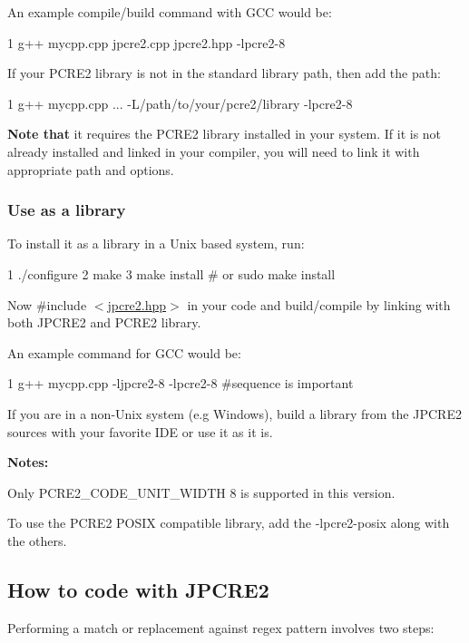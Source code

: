 An example compile/build command with G\+CC would be\+:


\begin{DoxyCode}
1 g++ mycpp.cpp jpcre2.cpp jpcre2.hpp -lpcre2-8
\end{DoxyCode}


If your P\+C\+R\+E2 library is not in the standard library path, then add the path\+:


\begin{DoxyCode}
1 g++ mycpp.cpp ... -L/path/to/your/pcre2/library -lpcre2-8
\end{DoxyCode}


{\bfseries Note that} it requires the P\+C\+R\+E2 library installed in your system. If it is not already installed and linked in your compiler, you will need to link it with appropriate path and options.\hypertarget{index_install-as-a-library}{}\subsubsection{Use as a library}\label{index_install-as-a-library}
To install it as a library in a Unix based system, run\+:


\begin{DoxyCode}
1 ./configure
2 make
3 make install # or sudo make install
\end{DoxyCode}
 Now {\ttfamily \#include $<$\hyperlink{jpcre2_8hpp}{jpcre2.\+hpp}$>$} in your code and build/compile by linking with both J\+P\+C\+R\+E2 and P\+C\+R\+E2 library.

An example command for G\+CC would be\+:


\begin{DoxyCode}
1 g++  mycpp.cpp -ljpcre2-8 -lpcre2-8 #sequence is important
\end{DoxyCode}


If you are in a non-\/\+Unix system (e.\+g Windows), build a library from the J\+P\+C\+R\+E2 sources with your favorite I\+DE or use it as it is.

{\bfseries Notes\+:}


\begin{DoxyEnumerate}
\item Only {\ttfamily P\+C\+R\+E2\+\_\+\+C\+O\+D\+E\+\_\+\+U\+N\+I\+T\+\_\+\+W\+I\+D\+TH} 8 is supported in this version.
\item To use the {\ttfamily P\+C\+R\+E2 P\+O\+S\+IX} compatible library, add the {\ttfamily -\/lpcre2-\/posix} along with the others.
\end{DoxyEnumerate}\hypertarget{index_how-to-code-with-jpcre2}{}\subsection{How to code with J\+P\+C\+R\+E2}\label{index_how-to-code-with-jpcre2}
Performing a match or replacement against regex pattern involves two steps\+:


